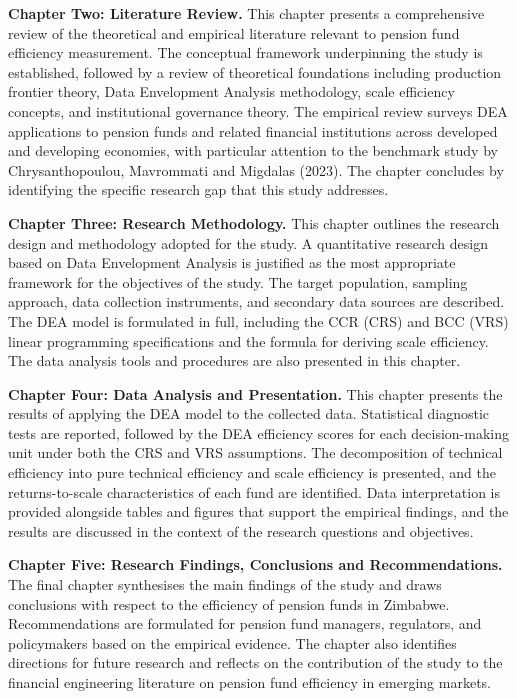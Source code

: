 \documentclass[12pt,a4paper]{article}
\begin{document}
\textbf{Chapter Two: Literature Review.} This chapter presents a comprehensive review of the theoretical and empirical literature relevant to pension fund efficiency measurement. The conceptual framework underpinning the study is established, followed by a review of theoretical foundations including production frontier theory, Data Envelopment Analysis methodology, scale efficiency concepts, and institutional governance theory. The empirical review surveys DEA applications to pension funds and related financial institutions across developed and developing economies, with particular attention to the benchmark study by Chrysanthopoulou, Mavrommati and Migdalas (2023). The chapter concludes by identifying the specific research gap that this study addresses.

\textbf{Chapter Three: Research Methodology.} This chapter outlines the research design and methodology adopted for the study. A quantitative research design based on Data Envelopment Analysis is justified as the most appropriate framework for the objectives of the study. The target population, sampling approach, data collection instruments, and secondary data sources are described. The DEA model is formulated in full, including the CCR (CRS) and BCC (VRS) linear programming specifications and the formula for deriving scale efficiency. The data analysis tools and procedures are also presented in this chapter.

\textbf{Chapter Four: Data Analysis and Presentation.} This chapter presents the results of applying the DEA model to the collected data. Statistical diagnostic tests are reported, followed by the DEA efficiency scores for each decision-making unit under both the CRS and VRS assumptions. The decomposition of technical efficiency into pure technical efficiency and scale efficiency is presented, and the returns-to-scale characteristics of each fund are identified. Data interpretation is provided alongside tables and figures that support the empirical findings, and the results are discussed in the context of the research questions and objectives.

\textbf{Chapter Five: Research Findings, Conclusions and Recommendations.} The final chapter synthesises the main findings of the study and draws conclusions with respect to the efficiency of pension funds in Zimbabwe. Recommendations are formulated for pension fund managers, regulators, and policymakers based on the empirical evidence. The chapter also identifies directions for future research and reflects on the contribution of the study to the financial engineering literature on pension fund efficiency in emerging markets.
\end{document}
